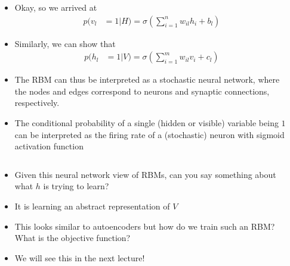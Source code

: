 \begin{frame}
	\begin{columns}
			\begin{overlayarea}{\textwidth}{\textheight}
			
			\end{overlayarea}
			\begin{overlayarea}{\textwidth}{\textheight}
				\footnotesize{
					\begin{itemize}\justifying
						\item<1-> Okay, so we arrived at 
						\begin{align*}
							p(v_l&=1|H) = \sigma(\sum_{i=1}^n w_{il}h_i + b_l)
						\end{align*}
						\item<2-> Similarly, we can show that
						\begin{align*}
							p(h_l&=1|V) = \sigma(\sum_{i=1}^m w_{il}v_i + c_l)
						\end{align*}
						\item<3-> The RBM can thus be interpreted as a stochastic neural network, where the nodes and edges correspond to neurons and synaptic connections, respectively.
						\item<4-> The conditional probability of a single (hidden or visible) variable being $1$ can be interpreted as the firing rate of a (stochastic) neuron with sigmoid activation function
					\end{itemize}
				}
			\end{overlayarea}
	\end{columns}
\end{frame}

\begin{frame}
	\begin{columns}
		\column{0.4\textwidth}
			\begin{overlayarea}{\textwidth}{\textheight}
			
			\end{overlayarea}
		\column{0.6\textwidth}
			\begin{overlayarea}{\textwidth}{\textheight}
				\begin{itemize}\justifying
					\item<1-> Given this neural network view of RBMs, can you say something about what $h$ is trying to learn?
					\item<2-> It is learning an abstract representation of $V$
					\item<3-> This looks similar to autoencoders but how do we train such an RBM? What is the objective function?
					\item<4-> We will see this in the next lecture!
				\end{itemize}
			\end{overlayarea}
	\end{columns}
\end{frame}

